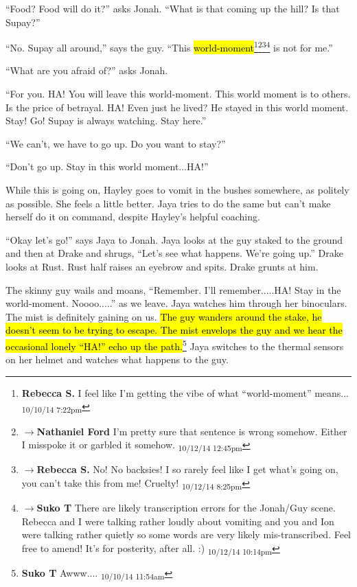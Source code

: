``Food?  Food will do it?'' asks Jonah.   ``What is that coming up the hill?  Is that Supay?''

``No.  Supay all around,'' says the guy.  ``This \hl{world-moment}\footnote{\textbf{Rebecca S. }I feel like I'm getting the vibe of what ``world-moment'' means... \textsubscript{10/10/14 7:22pm}}\footnote{$\rightarrow$\textbf{Nathaniel Ford }I'm pretty sure that sentence is wrong somehow. Either I misspoke it or garbled it somehow. \textsubscript{10/12/14 12:45pm}}\footnote{$\rightarrow$\textbf{Rebecca S. }No! No backsies! I so rarely feel like I get what's going on, you can't take this from me! Cruelty! \textsubscript{10/12/14 8:25pm}}\footnote{$\rightarrow$\textbf{Suko T }There are likely transcription errors for the Jonah/Guy scene.  Rebecca and I were talking rather loudly about vomiting and you and Ion were talking rather quietly so some words are very likely mis-transcribed.  Feel free to amend!  It's for posterity, after all. :) \textsubscript{10/12/14 10:14pm}} is not for me.''

``What are you afraid of?'' asks Jonah.

``For you.  HA!  You will leave this world-moment.  This world moment is to others.  Is the price of betrayal.  HA!  Even just he lived?  He stayed in this world moment.  Stay!   Go!   Supay is always watching.  Stay here.''

``We can't, we have to go up.  Do you want to stay?''

``Don't go up.  Stay in this world moment...HA!''

While this is going on, Hayley goes to vomit in the bushes somewhere, as politely as possible.  She feels a little better.  Jaya tries to do the same but can't make herself do it on command, despite Hayley's helpful coaching.

``Okay let's go!'' says Jaya to Jonah.  Jaya looks at the guy staked to the ground and then at Drake and shrugs, ``Let's see what happens. We're going up.''  Drake looks at Rust.  Rust half raises an eyebrow and spits.  Drake grunts at him.



The skinny guy wails and moans, ``Remember.  I'll remember.....HA!  Stay in the world-moment.  Noooo.....'' as we leave.  Jaya watches him through her binoculars.  The mist is definitely gaining on us.  \hl{The guy wanders around the stake, he doesn't seem to be trying to escape.  The mist envelops the guy and we hear the occasional lonely ``HA!'' echo up the path.}\footnote{\textbf{Suko T }Awww.... \textsubscript{10/10/14 11:54am}}  Jaya switches to the thermal sensors on her helmet and watches what happens to the guy.

